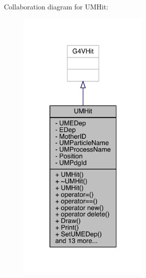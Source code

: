 Collaboration diagram for U\+M\+Hit\+:
\nopagebreak
\begin{figure}[H]
\begin{center}
\leavevmode
\includegraphics[width=180pt]{classUMHit__coll__graph}
\end{center}
\end{figure}
